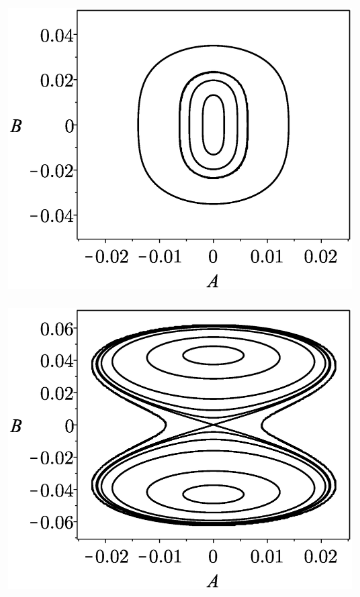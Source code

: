 \documentclass[LaTeX2e,10pt]{beamer}
\begin{document}
\begin{frame}
\begin{figure}
\begin{subfigure}[b]{0.35\textwidth}
{\includegraphics[width=\textwidth]{Images/PhasePortraitdeltaOver2.eps}}
\caption{}%
\label{fig:pointa}
\end{subfigure}%
\begin{subfigure}[b]{0.35\textwidth}
{\includegraphics[width=\textwidth]{Images/PhasePortraitdeltaZero.eps}}
\caption{}%
\label{fig:pointb}
 \end{subfigure}%

\end{figure}
\end{frame}
\end{document}
